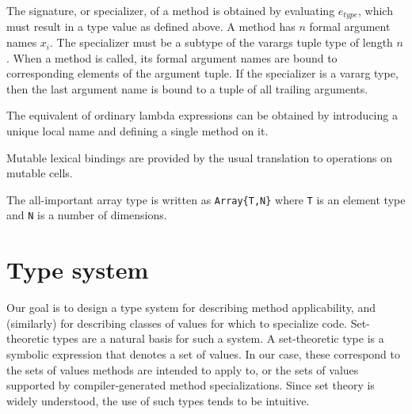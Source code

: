 The signature, or specializer, of a method is obtained by evaluating $e_{type}$,
which must result in a type value as defined above. A method has $n$
formal argument names $x_i$. The specializer must be a subtype of the
varargs tuple type of length $n$. When a method is called, its formal argument
names are bound to corresponding elements of the argument tuple. If the
specializer is a vararg type, then the last argument name is bound to a
tuple of all trailing arguments.


The equivalent of ordinary lambda expressions can be obtained by introducing
a unique local name and defining a single method on it.

Mutable lexical bindings are provided by the usual translation to operations
on mutable cells.

The all-important array type is written as \texttt{Array\{T,N\}} where
\texttt{T} is an element type and \texttt{N} is a number of dimensions.





\section{Type system}

Our goal is to design a type system for describing method applicability,
and (similarly) for describing classes of values for which to specialize code.
Set-theoretic types are a natural basis for such a system.
A set-theoretic type is a symbolic expression that denotes a set of values.
In our case, these correspond to the sets of values methods are intended to apply
to, or the sets of values supported by compiler-generated method specializations.
Since set theory is widely understood, the use of such types tends to be intuitive.

